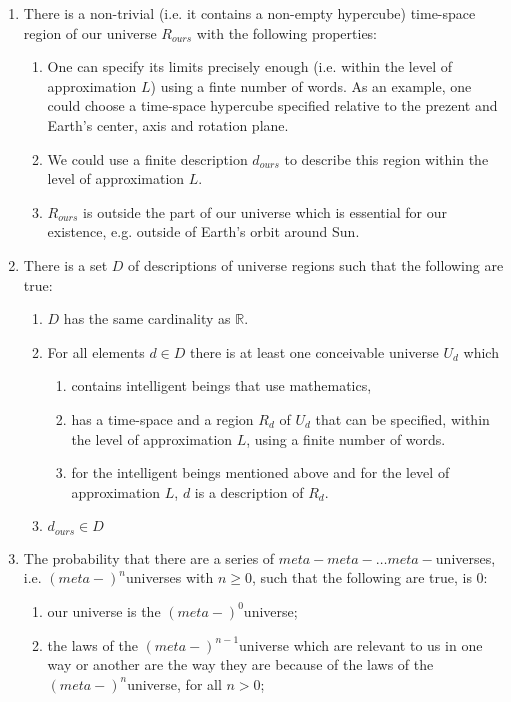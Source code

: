 \documentclass[a4paper
,draft
]{article}
\def\reale{\mathbb{R}}
\begin{document}
\begin{enumerate}
\item \label{nonessentialhypercube} There is a non-trivial (i.e. it contains a non-empty hypercube) time-space region of our universe $R_{ours}$ with the following properties:
  \begin{enumerate}
    \item One can specify its limits precisely enough (i.e. within the level of approximation $L$) using a finte number of words. As an example, one could choose a time-space hypercube specified relative to the prezent and Earth's center, axis and rotation plane.
    \item We could use a finite description $d_{ours}$ to describe this region within the level of approximation $L$.
    \item $R_{ours}$ is outside the part of our universe which is essential for our existence, e.g. outside of Earth's orbit around Sun.
  \end{enumerate}
\item \label{uncountable} There is a set $D$ of descriptions of universe regions such that the following are true:
  \begin{enumerate}
    \item $D$ has the same cardinality as $\reale$.
    \item For all elements $d\in D$ there is at least one conceivable universe $U_d$ which
      \begin{enumerate}
        \item contains intelligent beings that use mathematics,
        \item has a time-space and a region $R_d$ of $U_d$ that can be specified, within the level of approximation $L$, using a finite number of words.
        \item for the intelligent beings mentioned above and for the level of approximation $L$, $d$ is a description of $R_d$.
      \end{enumerate}
    \item $d_{ours}\in D$
  \end{enumerate}
\item \label{infinitechain} The probability that there are a series of $meta-meta-\dots meta-$universes, i.e. $(meta-)^n$universes with $n\ge 0$, such that the following are true, is $0$:
  \begin{enumerate}
    \item our universe is the $(meta-)^0$universe;
    \item the laws of the $(meta-)^{n-1}$universe which are relevant to us in one way or another are the way they are because of the laws of the $(meta-)^n$universe, for all $n > 0$;

\end{enumerate}
\end{enumerate}
\end{document}
